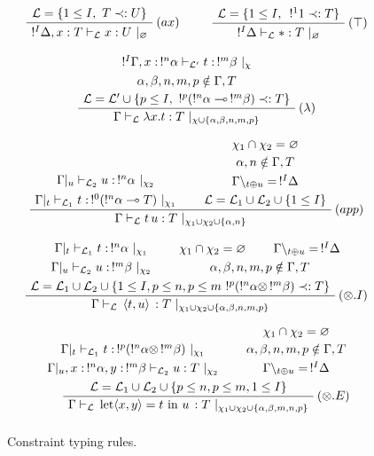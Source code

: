 \begin{figure}[!ht]
\begin{mdframed}
	$$ $$
	$$ \mbox{
		\AxiomC{$\mathcal{L} = \{1 \le I, ~ T \prec: U\}$}
		\RightLabel{$(ax)$}
		\UnaryInfC{$!^I \Delta, x : T \vdash_\mathcal{L} x : U ~|_\varnothing$}
		\DisplayProof
		~~
		~~
		\AxiomC{$\mathcal{L} = \{1 \le I, ~ \,!^1 1 \prec: T \}$}
		\RightLabel{$(\top)$}
		\UnaryInfC{$!^I \Delta \vdash_\mathcal{L} * : T ~|_\varnothing$}
		\DisplayProof
	} $$
	$$ $$
	$$ \mbox{
		\AxiomC{$!^I\Gamma, x : \,!^n\alpha \vdash_\mathcal{L'} t : \,!^m\beta ~|_\chi$} \noLine
		\UnaryInfC{$\alpha, \beta, n, m, p \notin \Gamma, T$} \noLine
		\UnaryInfC{$\mathcal{L} = \mathcal{L'} \cup \{ p \le I, ~ !^p(!^n\alpha \multimap \,!^m\beta) \prec: T \}$}
		\RightLabel{$(\lambda)$}
		\UnaryInfC{$\Gamma \vdash_\mathcal{L} \lambda x.t : T ~|_{\chi \cup \{\alpha, \beta, n, m, p \}}$}
		\DisplayProof
	} $$
	$$ $$
	$$ \mbox{
		\AxiomC{$\Gamma|_u \vdash_{\mathcal{L}_2} u : \,!^n\alpha ~|_{\chi_2}$} \noLine
		\UnaryInfC{$\Gamma|_t \vdash_{\mathcal{L}_1} t : \,!^0(!^n\alpha \multimap T) ~|_{\chi_1}$} \noLine
		\AxiomC{$\chi_1 \cap \chi_2 = \varnothing$} \noLine
    \UnaryInfC{$\alpha, n \notin \Gamma, T$} \noLine
    \UnaryInfC{$\Gamma \backslash_{t \oplus u} = \,!^I \Delta$} \noLine
    \UnaryInfC{$\mathcal{L} = \mathcal{L}_1 \cup \mathcal{L}_2 \cup \{ 1 \le I \}$}
		\RightLabel{$(app)$}
		\BinaryInfC{$\Gamma \vdash_\mathcal{L} t \, u : T ~|_{\chi_1 \cup \chi_2 \cup \{ \alpha, n\}}$}
		\DisplayProof
	} $$
	$$ $$	
	$$ \mbox{
		\AxiomC{$\Gamma|_t \vdash_{\mathcal{L}_1} t : \, !^n\alpha ~|_{\chi_1}$} \noLine
		\UnaryInfC{$\Gamma|_u \vdash_{\mathcal{L}_2} u : \, !^m\beta ~|_{\chi_2}$}
		\AxiomC{$\chi_1 \cap \chi_2 = \varnothing$} \noLine
		\AxiomC{$\Gamma \backslash_{t \oplus u} = \,!^I \Delta$} \noLine
		\BinaryInfC{$\alpha, \beta, n, m, p \notin \Gamma, T$} \noLine
		\BinaryInfC{$\mathcal{L} = \mathcal{L}_1 \cup \mathcal{L}_2 \cup \{ 1 \le I, p \le n, p \le m ~!^p(!^n\alpha \otimes \,!^m\beta) \prec: T \}$}
		\RightLabel{$(\otimes.I)$}
		\UnaryInfC{$\Gamma \vdash_\mathcal{L} \, \pair{t}{u} \, : T ~|_{\chi_1 \cup \chi_2 \cup \{\alpha, \beta, n, m, p \}}$}
		\DisplayProof
	} $$
	$$ $$
	$$ \mbox{
		\AxiomC{$\Gamma|_t \vdash_{\mathcal{L}_1} t : \, !^p (!^n\alpha \otimes \,!^m\beta) ~|_{\chi_1}$} \noLine
		\UnaryInfC{$\Gamma|_u, x : \,!^n\alpha, y : \,!^m\beta \vdash_{\mathcal{L}_2} u : T ~|_{\chi_2}$}
		\AxiomC{$\chi_1 \cap \chi_2 = \varnothing$} \noLine
		\UnaryInfC{$\alpha, \beta, n, m, p \notin \Gamma, T$} \noLine
		\UnaryInfC{$\Gamma \backslash_{t \oplus u} = \,!^I \Delta$} \noLine
		\BinaryInfC{$\mathcal{L} = \mathcal{L}_1 \cup \mathcal{L}_2 \cup \{ p \le n, p \le m, 1 \le I \}$}
		\RightLabel{$(\otimes.E)$}
		\UnaryInfC{$\Gamma \vdash_\mathcal{L} \, \text{let} \pair{x}{y} = t ~ \text{in} ~ u \, : T ~|_{\chi_1 \cup \chi_2 \cup \{\alpha,\beta,m,n,p \}}$}
		\DisplayProof
	} $$
	$$ $$
\end{mdframed}
\caption{Constraint typing rules.}
\label{ctypeQP'}
\end{figure}

